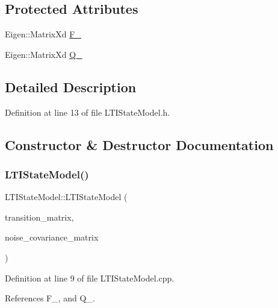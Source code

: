\subsection*{Protected Attributes}
\begin{DoxyCompactItemize}
\item 
Eigen\+::\+Matrix\+Xd \mbox{\hyperlink{classbfl_1_1LTIStateModel_afd54044a09d67c9eb0c7777d3a248aa5}{F\+\_\+}}
\item 
Eigen\+::\+Matrix\+Xd \mbox{\hyperlink{classbfl_1_1LTIStateModel_a8c0ec09b52b65246415b1483624959b7}{Q\+\_\+}}
\end{DoxyCompactItemize}


\subsection{Detailed Description}


Definition at line 13 of file L\+T\+I\+State\+Model.\+h.



\subsection{Constructor \& Destructor Documentation}
\mbox{\label{classbfl_1_1LTIStateModel_afac0939d317f9e871fd943f7eeddd898}} 
\subsubsection{\texorpdfstring{L\+T\+I\+State\+Model()}{LTIStateModel()}}
{\footnotesize\ttfamily L\+T\+I\+State\+Model\+::\+L\+T\+I\+State\+Model (\begin{DoxyParamCaption}\item[{const Eigen\+::\+Ref$<$ const Eigen\+::\+Matrix\+Xd $>$ \&}]{transition\+\_\+matrix,  }\item[{const Eigen\+::\+Ref$<$ const Eigen\+::\+Matrix\+Xd $>$ \&}]{noise\+\_\+covariance\+\_\+matrix }\end{DoxyParamCaption})}



Definition at line 9 of file L\+T\+I\+State\+Model.\+cpp.



References F\+\_\+, and Q\+\_\+.

